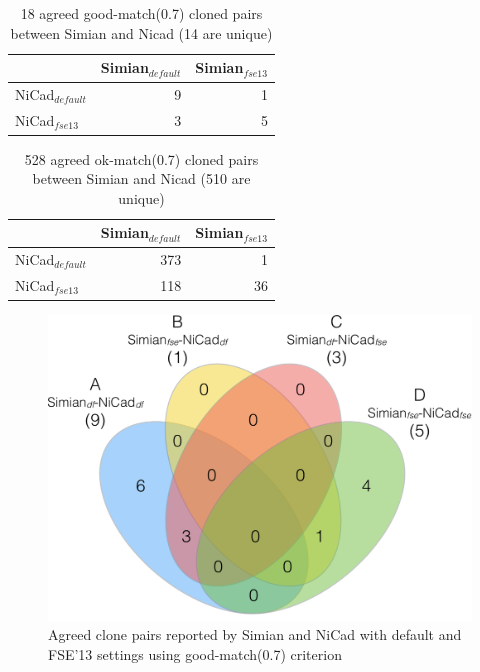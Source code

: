 \documentclass{IEEEtran}
\begin{document}
\begin{table}[h]
	\centering
	\caption{18 agreed good-match(0.7) cloned pairs between Simian and Nicad (14 are unique)}
	\label{t_agreed_good_clone_pairs}
	\begin{tabular}{l|r|r}
		\hline
		& Simian$_{\mathrm{\textit{default}}}$ & Simian$_{\mathrm{\textit{fse13}}}$ \\ %
		\hline
		NiCad$_{\mathrm{\textit{default}}}$ & 9 & 1 \\ %
		NiCad$_{\mathrm{\textit{fse13}}}$   & 3 & 5 \\ %
		\hline
	\end{tabular}
\end{table}

\begin{table}[h]
	\centering
	\caption{528 agreed ok-match(0.7) cloned pairs between Simian and Nicad (510 are unique)}
	\label{t_agreed_ok_clone_pairs}
	\begin{tabular}{l|r|r}
		\hline
		& Simian$_{\mathrm{\textit{default}}}$ & Simian$_{\mathrm{\textit{fse13}}}$ \\ %
		\hline
		NiCad$_{\mathrm{\textit{default}}}$ & 373 & 1 \\%
		NiCad$_{\mathrm{\textit{fse13}}}$   & 118 & 36 \\ %
		\hline
	\end{tabular}
\end{table}

\begin{figure}[H]
	\centering
	\includegraphics[width=0.5\linewidth]{venn4_pairs}
	\caption[Agreed clone pairs reported by Simian and NiCad with default and FSE'13 settings using good-match(0.7) criterion]{Agreed clone pairs reported by Simian and NiCad with default and FSE'13 settings using good-match(0.7) criterion}
	\label{fig:venn4_pairs}
\end{figure}
\end{document}
